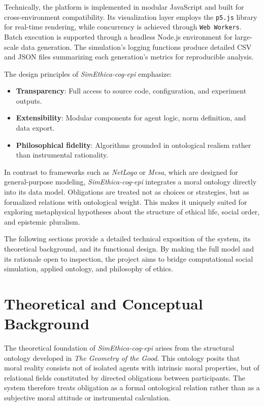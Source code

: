 \documentclass[11pt]{article}
\begin{document}
Technically, the platform is implemented in modular JavaScript and built for cross-environment compatibility. Its visualization layer employs the \texttt{p5.js} library for real-time rendering, while concurrency is achieved through \texttt{Web Workers}. Batch execution is supported through a headless Node.js environment for large-scale data generation. The simulation’s logging functions produce detailed CSV and JSON files summarizing each generation’s metrics for reproducible analysis.

The design principles of \textit{SimEthica-cog-epi} emphasize:
\begin{itemize}
  \item \textbf{Transparency}: Full access to source code, configuration, and experiment outputs.
  \item \textbf{Extensibility}: Modular components for agent logic, norm definition, and data export.
  \item \textbf{Philosophical fidelity}: Algorithms grounded in ontological realism rather than instrumental rationality.
\end{itemize}

In contrast to frameworks such as \textit{NetLogo} or \textit{Mesa}, which are designed for general-purpose modeling, \textit{SimEthica-cog-epi} integrates a moral ontology directly into its data model. Obligations are treated not as choices or strategies, but as formalized relations with ontological weight. This makes it uniquely suited for exploring metaphysical hypotheses about the structure of ethical life, social order, and epistemic pluralism.

The following sections provide a detailed technical exposition of the system, its theoretical background, and its functional design. By making the full model and its rationale open to inspection, the project aims to bridge computational social simulation, applied ontology, and philosophy of ethics.

\section{Theoretical and Conceptual Background}

The theoretical foundation of \textit{SimEthica-cog-epi} arises from the structural ontology developed in \textit{The Geometry of the Good}. This ontology posits that moral reality consists not of isolated agents with intrinsic moral properties, but of relational fields constituted by directed obligations between participants. The system therefore treats obligation as a formal ontological relation rather than as a subjective moral attitude or instrumental calculation.
\end{document}
